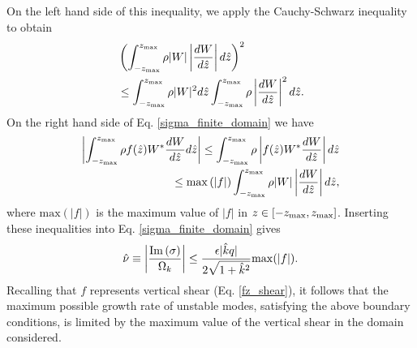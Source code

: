 On the left hand side of this inequality, we apply the Cauchy-Schwarz
inequality to obtain
\begin{align}
  &\left( \int_{-z_\mathrm{max}}^{z_\mathrm{max}}\rho
    |W|\left|\frac{dW}{d\hat{z}}\right|d\hat{z}\right)^2\notag\\&\leq
  \int_{-z_\mathrm{max}}^{z_\mathrm{max}}\rho 
  |W|^2d\hat{z}\int_{-z_\mathrm{max}}^{z_\mathrm{max}}\rho\left|\frac{dW}{d\hat{z}}\right|^2d\hat{z}.
\end{align}
On the right hand side of Eq. \ref{sigma_finite_domain} we have
\begin{align}
  \left|\int_{-z_\mathrm{max}}^{z_\mathrm{max}}\rho
    f(\hat{z}) W^*\frac{dW}{d\hat{z}}d\hat{z}\right|\leq \int_{-z_\mathrm{max}}^{z_\mathrm{max}}\rho
  \left|f(\hat{z})W^*\frac{dW}{d\hat{z}}\right|d\hat{z} \notag\\
  \leq
  \mathrm{max}\left(|f|\right)\int_{-z_\mathrm{max}}^{z_\mathrm{max}}\rho
  |W|\left|\frac{dW}{d\hat{z}}\right|d\hat{z},
\end{align}
where $\mathrm{max}(|f|)$ is the maximum value of $|f|$ in
$z\in[-z_\mathrm{max},z_\mathrm{max}]$. Inserting these inequalities into
Eq. \ref{sigma_finite_domain} gives
\begin{align}\label{max_growth}
  \hat{\nu}\equiv\left|\frac{\operatorname{Im}{(\sigma)}}{\Omega_k}\right| \leq
  \frac{\epsilon |\hat{k} q|}{2\sqrt{1+\hat{k}^2}}\mathrm{max}(|f|). 
\end{align}
Recalling that $f$ represents vertical shear (Eq. \ref{fz_shear}), it
follows that the maximum possible growth rate of unstable modes,
satisfying the above boundary conditions, is limited by the maximum
value of the vertical shear in the domain considered. 

